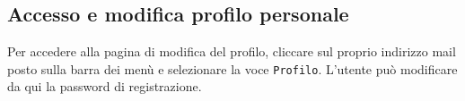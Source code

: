 	\subsection{Accesso e modifica profilo personale}
	\label{modificaprofilo}
	Per accedere alla pagina di modifica del profilo, cliccare sul proprio indirizzo mail posto sulla barra dei menù e selezionare la voce \texttt{Profilo}. L'utente può modificare da qui la password di registrazione.
